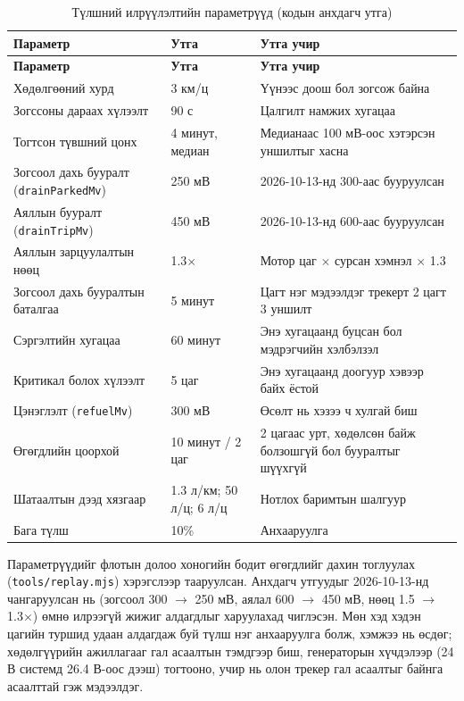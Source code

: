\documentclass[
12pt,
oneside,
english,
onehalfspacing,
nolistspacing,
headsepline,
]{MUST-Thesis}
\begin{document}
{\small
\renewcommand{\arraystretch}{1.2}
\begin{longtable}{|L{5.6cm}|L{2.6cm}|L{5.6cm}|}
\caption{Түлшний илрүүлэлтийн параметрүүд (кодын анхдагч утга)}\label{tab:ch3-thresholds}\\
\hline
{}\textbf{Параметр} & \textbf{Утга} & \textbf{Утга учир} \\ \hline
\endfirsthead
\hline
{}\textbf{Параметр} & \textbf{Утга} & \textbf{Утга учир} \\ \hline
\endhead
Хөдөлгөөний хурд & 3 км/ц & Үүнээс доош бол зогсож байна \\ \hline
Зогссоны дараах хүлээлт & 90 с & Цалгилт намжих хугацаа \\ \hline
Тогтсон түвшний цонх & 4 минут, медиан & Медианаас 100 мВ-оос хэтэрсэн уншилтыг хасна \\ \hline
Зогсоол дахь бууралт (\texttt{drainParkedMv}) & 250 мВ & 2026-10-13-нд 300-аас бууруулсан \\ \hline
Аяллын бууралт (\texttt{drainTripMv}) & 450 мВ & 2026-10-13-нд 600-аас бууруулсан \\ \hline
Аяллын зарцуулалтын нөөц & 1.3$\times$ & Мотор цаг $\times$ сурсан хэмнэл $\times$ 1.3 \\ \hline
Зогсоол дахь бууралтын баталгаа & 5 минут & Цагт нэг мэдээлдэг трекерт 2 цагт 3 уншилт \\ \hline
Сэргэлтийн хугацаа & 60 минут & Энэ хугацаанд буцсан бол мэдрэгчийн хэлбэлзэл \\ \hline
Критикал болох хүлээлт & 5 цаг & Энэ хугацаанд доогуур хэвээр байх ёстой \\ \hline
Цэнэглэлт (\texttt{refuelMv}) & 300 мВ & Өсөлт нь хэзээ ч хулгай биш \\ \hline
Өгөгдлийн цоорхой & 10 минут / 2 цаг & 2 цагаас урт, хөдөлсөн байж болзошгүй бол бууралтыг шүүхгүй \\ \hline
Шатаалтын дээд хязгаар & 1.3 л/км; 50 л/ц; 6 л/ц & Нотлох баримтын шалгуур \\ \hline
Бага түлш & 10\% & Анхааруулга \\ \hline
\end{longtable}
}

Параметрүүдийг флотын долоо хоногийн бодит өгөгдлийг дахин тоглуулах (\texttt{tools/replay.mjs}) хэрэгслээр тааруулсан. Анхдагч утгуудыг 2026-10-13-нд чангаруулсан нь (зогсоол 300 $\rightarrow$ 250 мВ, аялал 600 $\rightarrow$ 450 мВ, нөөц 1.5 $\rightarrow$ 1.3$\times$) өмнө илрээгүй жижиг алдагдлыг харуулахад чиглэсэн. Мөн хэд хэдэн цагийн туршид удаан алдагдаж буй түлш нэг анхааруулга болж, хэмжээ нь өсдөг; хөдөлгүүрийн ажиллагааг гал асаалтын тэмдгээр биш, генераторын хүчдэлээр (24 В системд 26.4 В-оос дээш) тогтооно, учир нь олон трекер гал асаалтыг байнга асаалттай гэж мэдээлдэг.
\end{document}
